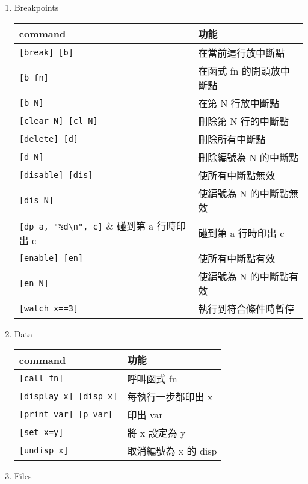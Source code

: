 \begin{enumerate}
    \item Breakpoints \par
    \begin{tabular}[c]{|p{2.28cm}|p{2.68cm}|}
        \hline
        command                         & 功能 \\
        \hline
        \verb|[break] [b]|              & 在當前這行放中斷點 \\
        \verb|[b fn]|                   & 在函式 fn 的開頭放中斷點 \\
        \verb|[b N]|                    & 在第 N 行放中斷點 \\
        \verb|[clear N] [cl N]|         & 刪除第 N 行的中斷點 \\
        \verb|[delete] [d]|             & 刪除所有中斷點 \\
        \verb|[d N]|                    & 刪除編號為 N 的中斷點 \\
        \verb|[disable] [dis]|          & 使所有中斷點無效 \\
        \verb|[dis N]|                  & 使編號為 N 的中斷點無效 \\
        \verb|[dp a, "%d\n", c]|        & 碰到第 a 行時印出 c \\
        \verb|[enable] [en]|            & 使所有中斷點有效 \\
        \verb|[en N]|                   & 使編號為 N 的中斷點有效 \\
        \verb|[watch x==3]|             & 執行到符合條件時暫停 \\
        \hline
    \end{tabular}
    \item Data \par
    \begin{tabular}[c]{|p{2.28cm}|p{2.68cm}|}
        \hline
        command                         & 功能 \\
        \hline
        \verb|[call fn]|                & 呼叫函式 fn \\
        \verb|[display x] [disp x]|     & 每執行一步都印出 x \\
        \verb|[print var] [p var]|      & 印出 var \\
        \verb|[set x=y]|                & 將 x 設定為 y \\
        \verb|[undisp x]|               & 取消編號為 x 的 disp \\
        \hline
    \end{tabular}
    \item Files \par

\end{enumerate}
